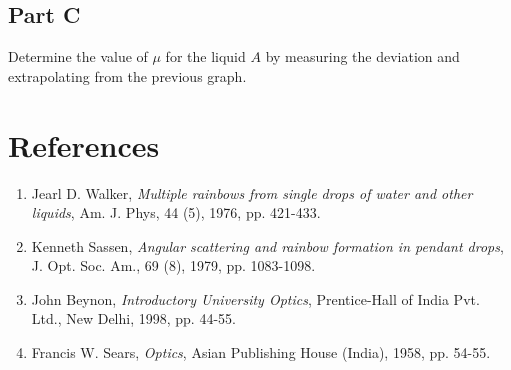 \subsection*{Part C}
Determine the value of $\mu$ for the liquid $A$ by measuring the deviation and extrapolating from the previous graph.



\section*{References}
\begin{enumerate}
\item Jearl D. Walker, \textit{Multiple rainbows from single drops of water and other liquids}, Am. J. Phys, 44 (5), 1976, pp. 421-433.
\item Kenneth Sassen, \textit{Angular scattering and rainbow formation in pendant drops}, J. Opt. Soc. Am., 69 (8), 1979, pp. 1083-1098. 
\item John Beynon, \textit{Introductory University Optics}, Prentice-Hall of India Pvt. Ltd., New Delhi, 1998, pp. 44-55.
\item Francis W. Sears, \textit{Optics}, Asian Publishing House (India), 1958, pp. 54-55. 

\end{enumerate}

